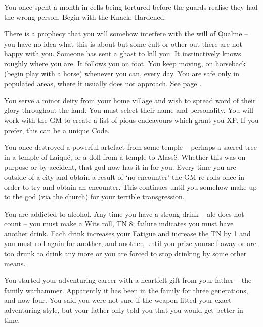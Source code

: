 \begin{multicols}{2}
\begin{list}{\addtocounter{list}{1}\textbf{:}}{\raggedleft}
	\item
	You once spent a month in cells being tortured before the guards realise they had the wrong person.
	Begin with the Knack: Hardened.

	\item
	There is a prophecy that you will somehow interfere with the will of Qualm\"{e} -- you have no idea what this is about but some cult or other out there are not happy with you.
	Someone has sent a ghast to kill you.
	It instinctively knows roughly where you are.
	It follows you on foot.
	You keep moving, on horseback (begin play with a horse) whenever you can, every day.
	You are safe only in populated areas, where it usually does not approach.
	See page \pageref{ghast}.

	\item
	You serve a minor deity from your home village and wish to spread word of their glory throughout the land.
	You must select their name and personality.
	You will work with the GM to create a list of pious endeavours which grant you XP.
	If you prefer, this can be a unique Code.

	\item
	You once destroyed a powerful artefact from some temple -- perhaps a sacred tree in a temple of Laiqu\"{e}, or a doll from a temple to Alass\"e.
	Whether this was on purpose or by accident, that god now has it in for you.  Every time you are outside of a city and obtain a result of `no encounter' the GM re-rolls once in order to try and obtain an encounter.
	This continues until you somehow make up to the god (via the church) for your terrible transgression.

	\item
	You are addicted to alcohol.
	Any time you have a strong drink -- ale does not count -- you must make a Wits roll, TN 8; failure indicates you must have another drink.
	Each drink increases your Fatigue and increase the TN by 1 and you must roll again for another, and another, until you prize yourself away or are too drunk to drink any more or you are forced to stop drinking by some other means.

	\item
	You started your adventuring career with a heartfelt gift from your father -- the family warhammer.
	Apparently it has been in the family for three generations, and now four.
	You said you were not sure if the weapon fitted your exact adventuring style, but your father only told you that you would get better in time.


\end{list}
\end{multicols}
